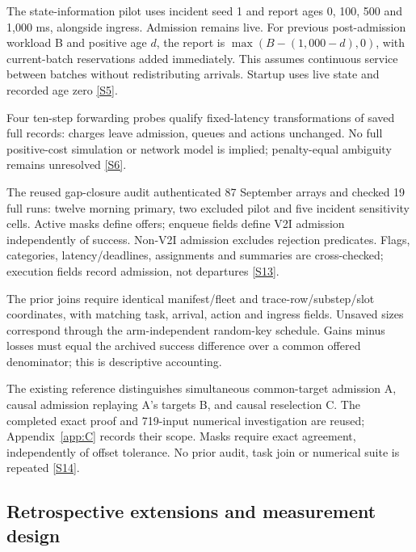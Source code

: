 \documentclass[11pt,a4paper]{article}
\begin{document}
The state-information pilot uses incident seed 1 and report ages 0, 100, 500 and 1,000 ms, alongside ingress. Admission remains live. For previous post-admission workload B and positive age $d$, the report is $\max(B-(1{,}000-d),0)$, with current-batch reservations added immediately. This assumes continuous service between batches without redistributing arrivals. Startup uses live state and recorded age zero \hyperref[source-s5]{[S5]}.

Four ten-step forwarding probes qualify fixed-latency transformations of saved full records: charges leave admission, queues and actions unchanged. No full positive-cost simulation or network model is implied; penalty-equal ambiguity remains unresolved \hyperref[source-s6]{[S6]}.

The reused gap-closure audit authenticated 87 September arrays and checked 19 full runs: twelve morning primary, two excluded pilot and five incident sensitivity cells. Active masks define offers; enqueue fields define V2I admission independently of success. Non-V2I admission excludes rejection predicates. Flags, categories, latency/deadlines, assignments and summaries are cross-checked; execution fields record admission, not departures \hyperref[source-s13]{[S13]}.

The prior joins require identical manifest/fleet and trace-row/substep/slot coordinates, with matching task, arrival, action and ingress fields. Unsaved sizes correspond through the arm-independent random-key schedule. Gains minus losses must equal the archived success difference over a common offered denominator; this is descriptive accounting.

The existing reference distinguishes simultaneous common-target admission A, causal admission replaying A's targets B, and causal reselection C. The completed exact proof and 719-input numerical investigation are reused; Appendix~\ref{app:C} records their scope. Masks require exact agreement, independently of offset tolerance. No prior audit, task join or numerical suite is repeated \hyperref[source-s14]{[S14]}.

\subsection{Retrospective extensions and measurement design}\label{sec:2.8}
\end{document}
